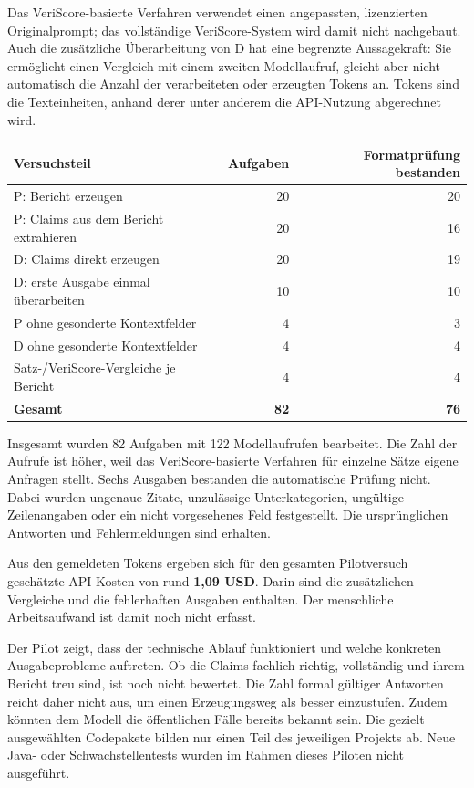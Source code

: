 \documentclass[10pt,a4paper]{article}
\begin{document}
Das VeriScore-basierte Verfahren verwendet einen angepassten, lizenzierten Originalprompt; das vollständige VeriScore-System wird damit nicht nachgebaut. Auch die zusätzliche Überarbeitung von D hat eine begrenzte Aussagekraft: Sie ermöglicht einen Vergleich mit einem zweiten Modellaufruf, gleicht aber nicht automatisch die Anzahl der verarbeiteten oder erzeugten Tokens an. Tokens sind die Texteinheiten, anhand derer unter anderem die API-Nutzung abgerechnet wird.

\begin{tabularx}{\linewidth}{@{}Yrr@{}}
\toprule
\textbf{Versuchsteil} & \textbf{Aufgaben} & \textbf{Formatprüfung bestanden} \\ \midrule
P: Bericht erzeugen & 20 & 20 \\
P: Claims aus dem Bericht extrahieren & 20 & 16 \\
D: Claims direkt erzeugen & 20 & 19 \\
D: erste Ausgabe einmal überarbeiten & 10 & 10 \\
P ohne gesonderte Kontextfelder & 4 & 3 \\
D ohne gesonderte Kontextfelder & 4 & 4 \\
Satz-/VeriScore-Vergleiche je Bericht & 4 & 4 \\
\midrule
\textbf{Gesamt} & \textbf{82} & \textbf{76} \\
\bottomrule
\end{tabularx}

Insgesamt wurden 82 Aufgaben mit 122 Modellaufrufen bearbeitet. Die Zahl der Aufrufe ist höher, weil das VeriScore-basierte Verfahren für einzelne Sätze eigene Anfragen stellt. Sechs Ausgaben bestanden die automatische Prüfung nicht. Dabei wurden ungenaue Zitate, unzulässige Unterkategorien, ungültige Zeilenangaben oder ein nicht vorgesehenes Feld festgestellt. Die ursprünglichen Antworten und Fehlermeldungen sind erhalten.

Aus den gemeldeten Tokens ergeben sich für den gesamten Pilotversuch geschätzte API-Kosten von rund \textbf{1,09 USD}. Darin sind die zusätzlichen Vergleiche und die fehlerhaften Ausgaben enthalten. Der menschliche Arbeitsaufwand ist damit noch nicht erfasst.

Der Pilot zeigt, dass der technische Ablauf funktioniert und welche konkreten Ausgabeprobleme auftreten. Ob die Claims fachlich richtig, vollständig und ihrem Bericht treu sind, ist noch nicht bewertet. Die Zahl formal gültiger Antworten reicht daher nicht aus, um einen Erzeugungsweg als besser einzustufen. Zudem könnten dem Modell die öffentlichen Fälle bereits bekannt sein. Die gezielt ausgewählten Codepakete bilden nur einen Teil des jeweiligen Projekts ab. Neue Java- oder Schwachstellentests wurden im Rahmen dieses Piloten nicht ausgeführt.
\end{document}
